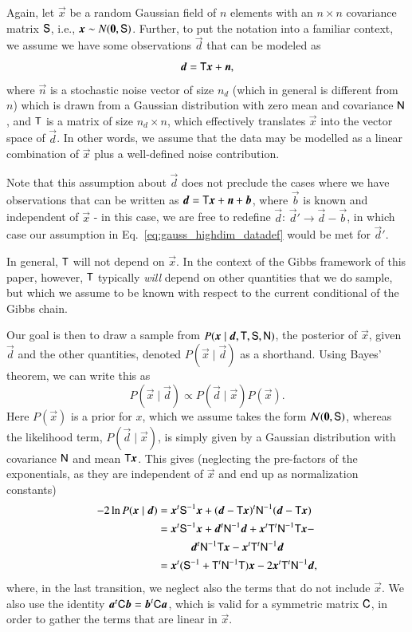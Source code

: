 \documentclass[twocolumn]{aa}
\renewcommand{\d}[0]{\vec{d}}
\newcommand{\n}[0]{\vec{n}}
\newcommand{\x}[0]{\vec{x}}
\renewcommand{\a}[0]{\vec{a}}
\newcommand{\T}[0]{\tens{T}}
\renewcommand{\b}[0]{\vec{b}}
\newcommand{\N}[0]{\tens{N}}
\renewcommand{\C}[0]{\tens{C}}
\renewcommand{\S}[0]{\tens{S}}
\begin{document}
Again, let $\x$ be a random Gaussian field of $n$ elements with an
$n\times n$ covariance matrix $\S$, i.e., $\x \sim N(\vec 0,
\S)$. Further, to put the notation into a familiar context, we assume
we have some observations $\d$ that can be modeled as
\begin{equation}
    \d = \T\x + \n,
    \label{eq:gauss_highdim_datadef}
\end{equation}
where $\n$ is a stochastic noise vector of size $n_d$ (which in
general is different from $n$) which is drawn from a Gaussian
distribution with zero mean and covariance $\N$, and $\T$ is a matrix
of size $n_d\times n$, which effectively translates $\x$ into the
vector space of $\d$. In other words, we assume that the data may be
modelled as a linear combination of $\x$ plus a well-defined noise
contribution.

Note that this assumption about $\d$ does not preclude the cases where we have observations that can be written as $\d = \T\x + \n + \b$, where $\b$ is known and independent of $\x$ - in this case, we are free to redefine $\d$: $\d' \rightarrow \d - \b$, in which case our assumption in Eq.~\eqref{eq:gauss_highdim_datadef} would be met for $\d'$.

In general, $\T$ will not depend on $\x$. In the context of the Gibbs
framework of this paper, however, $\T$ typically \emph{will} depend on
other quantities that we do sample, but which we assume to be known
with respect to the current conditional of the Gibbs chain.

Our goal is then to draw a sample from $P(\x \mid  \d, \T, \S, \N)$, the
posterior of $\x$, given $\d$ and the other quantities, denoted
$P(\x\mid \d)$ as a shorthand. Using Bayes' theorem, we can write this as
\begin{equation}
    P(\x \mid  \d) \propto P(\d \mid  \x) P(\x).
\end{equation}
Here $P(\x)$ is a prior for $x$, which we assume takes the form
$\mathcal{N}(\vec 0, \S)$, whereas the likelihood term, $P(\d \mid  \x)$, is
simply given by a Gaussian distribution with covariance $\N$ and mean $\T\x$.
This gives (neglecting the pre-factors of the exponentials, as they are independent of $\x$ and end up as normalization constants)
\begin{align}
    -2\ln P(\x\mid \d) & = \x^t\S^{-1}\x + (\d-\T\x)^t\N^{-1}(\d - \T\x) \nonumber \\
             & = \x^t\S^{-1}\x + \d^t\N^{-1}\d + \x^t\T^t\N^{-1}\T\x -\nonumber
    \\ &\quad\quad\quad\d^t\N^{-1}\T\x - \x^t\T^t\N^{-1}\d \nonumber \\ 
             & = \x^t(\S^{-1} + \T^t\N^{-1}\T)\x - 2\x^t\T^t\N^{-1}\d,
    \label{eq:gauss_highdim_posterior}
\end{align}
where, in the last transition, we neglect also the terms that do not
include $\x$. We also use the identity $\a^t\C \b = \b^t\C \a$,
which is valid for a symmetric matrix $\C$, in order to gather the
terms that are linear in $\x$.
\end{document}
